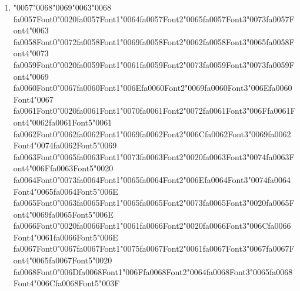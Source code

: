 \documentclass[11pt]{article}
\begin{document}
\begin{enumerate}[label=Q\arabic*., leftmargin=*]
\item {\char"0057}{\char"0068}{\char"0069}{\char"0063}{\char"0068} {\csname fa0057Font0\endcsname\char"0020}{\csname fa0057Font1\endcsname\char"0064}{\csname fa0057Font2\endcsname\char"0065}{\csname fa0057Font3\endcsname\char"0073}{\csname fa0057Font4\endcsname\char"0063} {\csname fa0058Font0\endcsname\char"0072}{\csname fa0058Font1\endcsname\char"0069}{\csname fa0058Font2\endcsname\char"0062}{\csname fa0058Font3\endcsname\char"0065}{\csname fa0058Font4\endcsname\char"0073} {\csname fa0059Font0\endcsname\char"0020}{\csname fa0059Font1\endcsname\char"0061}{\csname fa0059Font2\endcsname\char"0073}{\csname fa0059Font3\endcsname\char"0073}{\csname fa0059Font4\endcsname\char"0069} {\csname fa0060Font0\endcsname\char"0067}{\csname fa0060Font1\endcsname\char"006E}{\csname fa0060Font2\endcsname\char"0069}{\csname fa0060Font3\endcsname\char"006E}{\csname fa0060Font4\endcsname\char"0067} {\csname fa0061Font0\endcsname\char"0020}{\csname fa0061Font1\endcsname\char"0070}{\csname fa0061Font2\endcsname\char"0072}{\csname fa0061Font3\endcsname\char"006F}{\csname fa0061Font4\endcsname\char"0062}{\csname fa0061Font5\endcsname\char"0061} {\csname fa0062Font0\endcsname\char"0062}{\csname fa0062Font1\endcsname\char"0069}{\csname fa0062Font2\endcsname\char"006C}{\csname fa0062Font3\endcsname\char"0069}{\csname fa0062Font4\endcsname\char"0074}{\csname fa0062Font5\endcsname\char"0069} {\csname fa0063Font0\endcsname\char"0065}{\csname fa0063Font1\endcsname\char"0073}{\csname fa0063Font2\endcsname\char"0020}{\csname fa0063Font3\endcsname\char"0074}{\csname fa0063Font4\endcsname\char"006F}{\csname fa0063Font5\endcsname\char"0020} {\csname fa0064Font0\endcsname\char"0073}{\csname fa0064Font1\endcsname\char"0065}{\csname fa0064Font2\endcsname\char"006E}{\csname fa0064Font3\endcsname\char"0074}{\csname fa0064Font4\endcsname\char"0065}{\csname fa0064Font5\endcsname\char"006E} {\csname fa0065Font0\endcsname\char"0063}{\csname fa0065Font1\endcsname\char"0065}{\csname fa0065Font2\endcsname\char"0073}{\csname fa0065Font3\endcsname\char"0020}{\csname fa0065Font4\endcsname\char"0069}{\csname fa0065Font5\endcsname\char"006E} {\csname fa0066Font0\endcsname\char"0020}{\csname fa0066Font1\endcsname\char"0061}{\csname fa0066Font2\endcsname\char"0020}{\csname fa0066Font3\endcsname\char"006C}{\csname fa0066Font4\endcsname\char"0061}{\csname fa0066Font5\endcsname\char"006E} {\csname fa0067Font0\endcsname\char"0067}{\csname fa0067Font1\endcsname\char"0075}{\csname fa0067Font2\endcsname\char"0061}{\csname fa0067Font3\endcsname\char"0067}{\csname fa0067Font4\endcsname\char"0065}{\csname fa0067Font5\endcsname\char"0020} {\csname fa0068Font0\endcsname\char"006D}{\csname fa0068Font1\endcsname\char"006F}{\csname fa0068Font2\endcsname\char"0064}{\csname fa0068Font3\endcsname\char"0065}{\csname fa0068Font4\endcsname\char"006C}{\csname fa0068Font5\endcsname\char"003F}\\[0.25em]

\end{enumerate}
\end{document}
